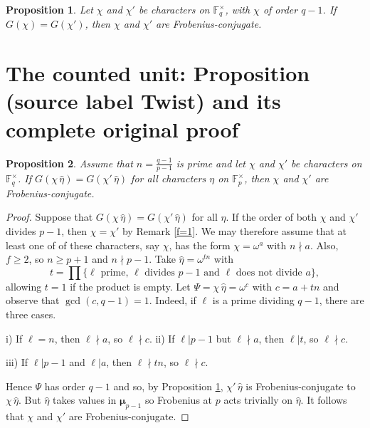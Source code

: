 \documentclass[10pt,a4paper]{amsart}
\newcommand{\F}{{\mathbb F}}
\newcommand{\Mu}{\boldsymbol \mu}
\theoremstyle{definition}
\theoremstyle{plain}
\newtheorem{prop}{Proposition}
\theoremstyle{definition}
\begin{document}
\begin{prop} \label{gcd1}
Let $\chi$ and $\chi'$ be characters on $\F_q^\times$, with $\chi$ of order $q-1$.  If $G(\chi) = G(\chi')$, then $\chi$ and $\chi'$ are Frobenius-conjugate.
\end{prop}


\section{The counted unit: Proposition (source label Twist) and its complete original proof}

\begin{prop} \label{Twist}
Assume that $n  = \frac{q-1}{p-1}$ is prime and let $\chi$ and $\chi'$ be characters on $\F_q^\times$.  If $G(\chi \, \widehat{\eta}) = G(\chi' \,  \widehat{\eta})$ for all characters $\eta$ on $\F_p^\times$, then $\chi$ and $\chi'$ are Frobenius-conjugate.
\end{prop}

\begin{proof}
Suppose that $G(\chi \, \widehat{\eta}) = G(\chi' \,  \widehat{\eta})$ for all $\eta$.  If the order of both $\chi$ and $\chi'$ divides $p-1$, then $\chi = \chi'$ by Remark \ref{f=1}.  We may therefore assume that at least one of of these characters, say $\chi$, has the form $\chi = \omega^a$ with $n \nmid a$.  Also, $f \ge 2$, so $n \ge p+1$ and $n \nmid p-1$.    Take $\widehat{\eta} = \omega^{tn}$ with 
$$ 
t = \prod \{ \ell \text{ prime}, \, \ell \text{ divides } p-1 \text{ and } \ell \text{ does not divide } a \},
$$ 
allowing $t=1$ if the product is empty.  Let $\Psi = \chi \, \widehat{\eta} = \omega^c$ with $c = a + tn$ and observe that $\gcd(c,q-1) = 1$. Indeed, if $\ell$ is a prime dividing $q-1$, there are three cases. \vspace{2 pt}

\noindent \hspace{9 pt} i)  If $\ell = n$, then $\ell \nmid a$, so $\ell \nmid c$.  \hspace{7 pt} ii) If $\ell \vert p-1$ but $\ell  \nmid a$, then $\ell \vert t$, so $\ell \nmid c$.   \vspace{2 pt}

\noindent \hspace{3 pt} iii) If $\ell \vert p-1$ and $\ell \vert a$, then $\ell \nmid tn$, so $\ell \nmid c$. \vspace{2 pt}

\noindent Hence $\Psi$ has order $q-1$ and so, by Proposition \ref{gcd1}, $\chi' \, \widehat{\eta}$ is Frobenius-conjugate to $\chi \, \widehat{\eta}$.  But $\widehat{\eta}$ takes values in $\Mu_{p-1}$ so Frobenius at $p$ acts trivially on $\widehat{\eta}$.  It follows that $\chi$ and $\chi'$ are Frobenius-conjugate.
\end{proof}
\end{document}
